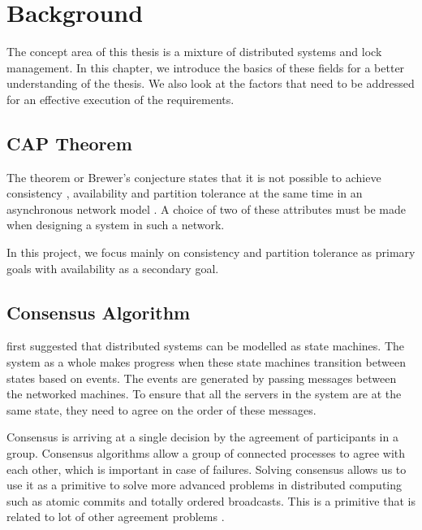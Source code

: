 \chapter{Background}
\label{chapter:background}

The concept area of this thesis is a mixture of distributed systems and lock
management. In this chapter, we introduce the basics of these fields for a
better understanding of the thesis. We also look at the factors that
need to be addressed for an effective execution of the requirements.

\section{CAP Theorem}

The  theorem or Brewer's conjecture states that it is not
possible to achieve consistency%
, availability%
and partition tolerance%
at the same time in an asynchronous network model
\citep{journals/sigact/GilbertL02}. A choice of two of these attributes must
be made when designing a system in such a network.

In this project, we focus mainly on consistency and partition tolerance%
as primary goals with availability as a secondary goal.

\section{Consensus Algorithm}

\citet{Lamclocks} first suggested that distributed systems can be modelled as
state machines. The system as a whole makes progress when these state machines
transition between states based on events. The events are  generated by passing
messages between the networked machines. To ensure that all the servers in the
system are at the same state, they need to agree on the order of these messages.

Consensus is arriving at a single decision by the agreement of participants in a
group. Consensus algorithms allow a group of connected processes to agree with
each other, which is important in case of failures. Solving consensus allows
us to use it as a primitive to solve more advanced problems in distributed
computing such as atomic commits and totally ordered broadcasts. This is a
primitive that is related to lot of other agreement problems \citep{GS01}.

